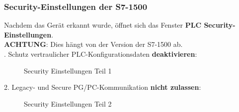 \subsubsection{Security-Einstellungen der S7-1500}
Nachdem das Gerät erkannt wurde, öffnet sich das Fenster \textbf{PLC Security-Einstellungen}.\\
\textbf{ACHTUNG}: Dies hängt von der Version der S7-1500 ab.\\
. Schutz vertraulicher PLC-Konfigurationsdaten \textbf{deaktivieren}:
\begin{figure}[H]
   \centering
   \caption[Security Einstellungen Teil 1]{Security Einstellungen Teil 1}
   \label{fig:Bild3.7}
\end{figure}

\clearpage

2. Legacy- und Secure PG/PC-Kommunikation \textbf{nicht zulassen}:
\begin{figure}[H]
   \centering
   \caption[Security Einstellungen Teil 2]{Security Einstellungen Teil 2}
   \label{fig:Bild3.8}
\end{figure}

